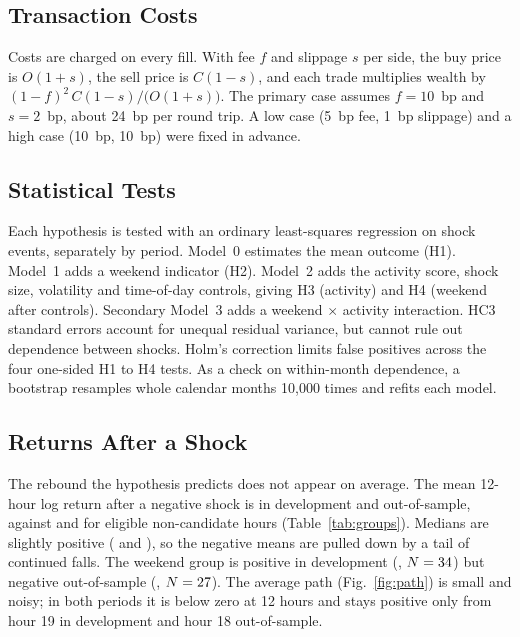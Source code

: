 \documentclass[11pt,a4paper]{article}
\begin{document}
\subsection{Transaction Costs}

Costs are charged on every fill. With fee $f$ and slippage $s$ per side, the buy price is $O(1+s)$, the sell price is $C(1-s)$, and each trade multiplies wealth by $(1-f)^2\,C(1-s)/\big(O(1+s)\big)$. The primary case assumes $f=10$~bp and $s=2$~bp, about 24~bp per round trip. A low case (5~bp fee, 1~bp slippage) and a high case (10~bp, 10~bp) were fixed in advance.

\subsection{Statistical Tests}

Each hypothesis is tested with an ordinary least-squares regression on shock events, separately by period. Model~0 estimates the mean outcome (H1). Model~1 adds a weekend indicator (H2). Model~2 adds the activity score, shock size, volatility and time-of-day controls, giving H3 (activity) and H4 (weekend after controls). Secondary Model~3 adds a weekend $\times$ activity interaction. HC3 standard errors account for unequal residual variance, but cannot rule out dependence between shocks. Holm's correction limits false positives across the four one-sided H1 to H4 tests. As a check on within-month dependence, a bootstrap resamples whole calendar months 10,000 times and refits each model.

\subsection{Returns After a Shock}

The rebound the hypothesis predicts does not appear on average. The mean 12-hour log return after a negative shock is \DevAllMean{} in development and \HoAllMean{} out-of-sample, against \DevDriftMean{} and \HoDriftMean{} for eligible non-candidate hours (Table~\ref{tab:groups}). Medians are slightly positive (\DevAllMedian{} and \HoAllMedian{}), so the negative means are pulled down by a tail of continued falls. The weekend group is positive in development (\DevWeekendMean{}, $N=34$) but negative out-of-sample (\HoWeekendMean{}, $N=27$). The average path (Fig.~\ref{fig:path}) is small and noisy; in both periods it is below zero at 12 hours and stays positive only from hour 19 in development and hour 18 out-of-sample.
\end{document}
